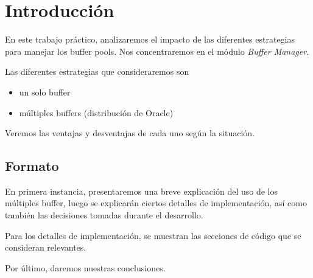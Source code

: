 \section{Introducci\'on}

En este trabajo pr\'actico, analizaremos el impacto de las diferentes
estrategias para manejar los buffer pools.
Nos concentraremos en el m\'odulo \textit{Buffer Manager}.

\vspace*{0.3cm}

Las diferentes estrategias que consideraremos son

\begin{itemize}
    \item
            un solo buffer
    \item
            múltiples buffers (distribución de Oracle)    
\end{itemize}

\vspace*{0.3cm}

Veremos las ventajas y desventajas de cada uno seg\'un la situaci\'on.

\subsection{Formato}

\vspace*{0.3cm}

En primera instancia, presentaremos una breve explicación
del uso de los múltiples buffer, luego se explicar\'an ciertos 
detalles de implementaci\'on, as\'i como tambi\'en las decisiones 
tomadas durante el desarrollo.

Para los detalles de implementación, se muestran las secciones 
de código que se consideran relevantes.

\vspace*{0.3cm}

Por \'ultimo, daremos nuestras conclusiones.

